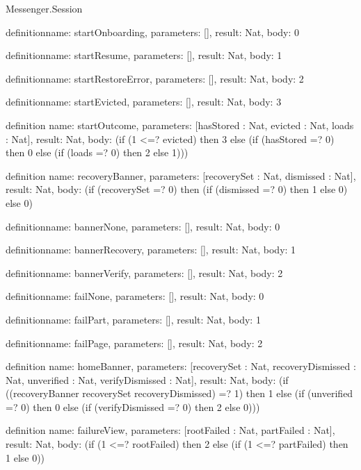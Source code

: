 \begin{lexlean}{Messenger.Session}
\begin{semanticmodule}
definition{name: startOnboarding, parameters: [], result: Nat, body: 0}

definition{name: startResume, parameters: [], result: Nat, body: 1}

definition{name: startRestoreError, parameters: [], result: Nat, body: 2}

definition{name: startEvicted, parameters: [], result: Nat, body: 3}

definition{
  name: startOutcome,
  parameters: [hasStored : Nat, evicted : Nat, loads : Nat],
  result: Nat,
  body: (if (1 <=? evicted) then 3 else (if (hasStored =? 0) then 0 else (if (loads =? 0) then 2 else 1)))
}

definition{
  name: recoveryBanner,
  parameters: [recoverySet : Nat, dismissed : Nat],
  result: Nat,
  body: (if (recoverySet =? 0) then (if (dismissed =? 0) then 1 else 0) else 0)
}

definition{name: bannerNone, parameters: [], result: Nat, body: 0}

definition{name: bannerRecovery, parameters: [], result: Nat, body: 1}

definition{name: bannerVerify, parameters: [], result: Nat, body: 2}

definition{name: failNone, parameters: [], result: Nat, body: 0}

definition{name: failPart, parameters: [], result: Nat, body: 1}

definition{name: failPage, parameters: [], result: Nat, body: 2}

definition{
  name: homeBanner,
  parameters: [recoverySet : Nat, recoveryDismissed : Nat, unverified : Nat, verifyDismissed : Nat],
  result: Nat,
  body: (if ((recoveryBanner recoverySet recoveryDismissed) =? 1) then 1 else (if (unverified =? 0) then 0 else (if (verifyDismissed =? 0) then 2 else 0)))
}

definition{
  name: failureView,
  parameters: [rootFailed : Nat, partFailed : Nat],
  result: Nat,
  body: (if (1 <=? rootFailed) then 2 else (if (1 <=? partFailed) then 1 else 0))
}
\end{semanticmodule}
\end{lexlean}
